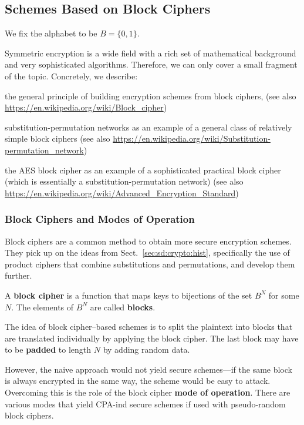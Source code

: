 \subsection{Schemes Based on Block Ciphers}

We fix the alphabet to be $B=\{0,1\}$.

Symmetric encryption is a wide field with a rich set of mathematical background and very sophisticated algorithms.
Therefore, we can only cover a small fragment of the topic.
Concretely, we describe:
\begin{compactitem}
 \item the general principle of building encryption schemes from block ciphers,
 (see also \url{https://en.wikipedia.org/wiki/Block_cipher})
 \item substitution-permutation networks as an example of a general class of relatively simple block ciphers
 (see also \url{https://en.wikipedia.org/wiki/Substitution-permutation_network})
 \item the AES block cipher as an example of a sophisticated practical block cipher (which is essentially a substitution-permutation network)
 (see also \url{https://en.wikipedia.org/wiki/Advanced_Encryption_Standard})
\end{compactitem}

\subsubsection{Block Ciphers and Modes of Operation}

Block ciphers are a common method to obtain more secure encryption schemes.
They pick up on the ideas from Sect.~\ref{sec:sd:crypto:hist}, specifically the use of product ciphers that combine substitutions and permutations, and develop them further.

A \textbf{block cipher} is a function that maps keys to bijections of the set $B^N$ for some $N$.
The elements of $B^N$ are called \textbf{blocks}.

The idea of block cipher--based schemes is to split the plaintext into blocks that are translated individually by applying the block cipher.
The last block may have to be \textbf{padded} to length $N$ by adding random data.

However, the naive approach would not yield secure schemes---if the same block is always encrypted in the same way, the scheme would be easy to attack.
Overcoming this is the role of the block cipher \textbf{mode of operation}.
There are various modes that yield CPA-ind secure schemes if used with pseudo-random block ciphers.

